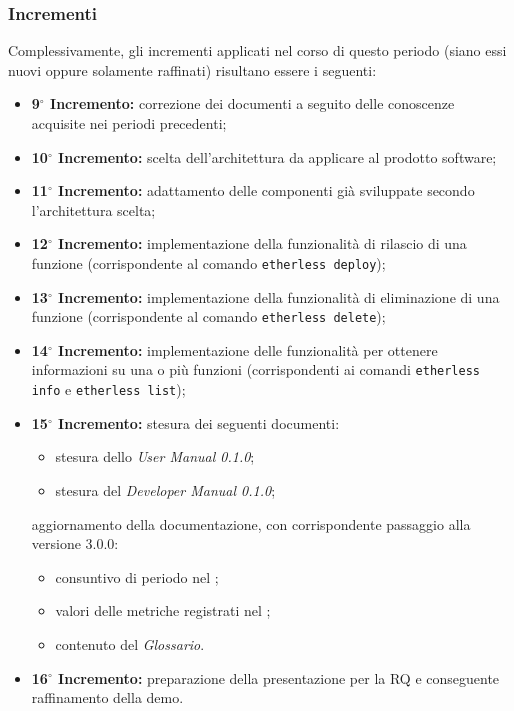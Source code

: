 \subsubsection{Incrementi}
Complessivamente, gli incrementi applicati nel corso di questo periodo (siano essi nuovi oppure solamente raffinati) risultano essere i seguenti:

\begin{itemize}
	\item \textbf{9$^{\circ}$ Incremento:} correzione dei documenti a seguito delle conoscenze acquisite nei periodi precedenti;
	\item \textbf{10$^{\circ}$ Incremento:} scelta dell'architettura da applicare al prodotto software;
	\item \textbf{11$^{\circ}$ Incremento:} adattamento delle componenti già sviluppate secondo l’architettura scelta;
\end{itemize}

\begin{itemize}
	\item \textbf{12$^{\circ}$ Incremento:} implementazione della funzionalità di rilascio di una funzione (corrispondente al comando \texttt{etherless deploy});
	\item \textbf{13$^{\circ}$ Incremento:} implementazione della funzionalità di eliminazione di una funzione (corrispondente al comando \texttt{etherless delete});
	\item \textbf{14$^{\circ}$ Incremento:} implementazione delle funzionalità per ottenere informazioni su una o più funzioni (corrispondenti ai comandi \texttt{etherless info} e \texttt{etherless list});
	\item \textbf{15$^{\circ}$ Incremento:} stesura dei seguenti documenti:
	\begin{itemize}
		\item stesura dello \textit{User Manual 0.1.0};
		\item stesura del \textit{Developer Manual 0.1.0};
	\end{itemize}
	aggiornamento della documentazione, con corrispondente passaggio alla versione 3.0.0:
	\begin{itemize}
		\item consuntivo di periodo nel \textit{\PdP{}};
		\item valori delle metriche registrati nel \textit{\PdQ{}};
		\item contenuto del \textit{Glossario}.
	\end{itemize}
	\item \textbf{16$^{\circ}$ Incremento:} preparazione della presentazione per la RQ e conseguente raffinamento della demo.
\end{itemize}

